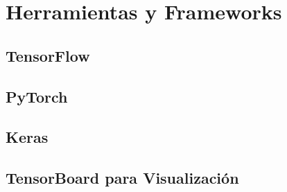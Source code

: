 \documentclass[12pt]{article}
\begin{document}
\section{Herramientas y Frameworks}


\subsection{TensorFlow}
\newpage
\subsection{PyTorch}
\newpage
\subsection{Keras}
\newpage
\subsection{TensorBoard para Visualización}
\newpage
\end{document}
